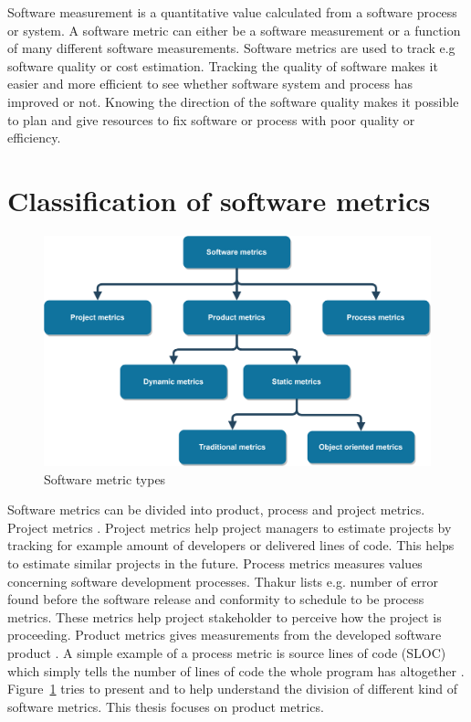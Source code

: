 Software measurement is a quantitative value calculated from a software process or system. A software metric can either be a software measurement or a function of many different software measurements. Software metrics are used to track e.g software quality or cost estimation. Tracking the quality of software makes it easier and more efficient to see whether software system and process has improved or not. Knowing the direction of the software quality makes it possible to plan and give resources to fix software or process with poor quality or efficiency. 

\section{Classification of software metrics}

\begin{figure}[t!]
\centering
\includegraphics[scale=0.05]{metrictree.png}
\caption{Software metric types}
\label{fig:metrictree}
\end{figure}

Software metrics can be divided into product, process and project metrics. Project metrics \cite{dineshthakur}. Project metrics help project managers to estimate projects by tracking for example amount of developers or delivered lines of code. This helps to estimate similar projects in the future. Process metrics measures values concerning software development processes. Thakur lists e.g. number of error found before the software release and conformity to schedule to be process metrics. These metrics help project stakeholder to perceive how the project is proceeding.
Product metrics gives measurements from the developed software product \cite{sommerville2011software}.  A simple example of a process metric is source lines of code (SLOC) which simply tells the number of lines of code the whole program has altogether \cite{nguyen2007sloc}. Figure~\ref{fig:metrictree} tries to present and to help understand the division of different kind of software metrics. This thesis focuses on product metrics. 

